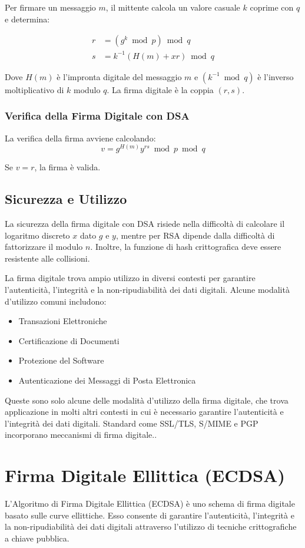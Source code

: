 \documentclass[a4paper,12pt]{report}
\begin{document}
Per firmare un messaggio $m$, il mittente calcola un valore casuale $k$ coprime con $q$ e determina:

\begin{align*}
r &= (g^k \bmod p) \bmod q \\
s &= k^{-1}(H(m) + xr) \bmod q
\end{align*}

Dove $H(m)$ è l'impronta digitale del messaggio $m$ e $(k^{-1} \bmod q)$ è l'inverso moltiplicativo di $k$ modulo $q$. La firma digitale è la coppia $(r, s)$.

\subsection*{Verifica della Firma Digitale con DSA}
La verifica della firma avviene calcolando:
\[v = g^{H(m)}y^{rs} \bmod p \bmod q\]

Se $v = r$, la firma è valida.

\section{Sicurezza e Utilizzo}
La sicurezza della firma digitale con DSA risiede nella difficoltà di calcolare il logaritmo discreto $x$ dato $g$ e $y$, mentre per RSA dipende dalla difficoltà di fattorizzare il modulo $n$. Inoltre, la funzione di hash crittografica deve essere resistente alle collisioni.

La firma digitale trova ampio utilizzo in diversi contesti per garantire l'autenticità, l'integrità e la non-ripudiabilità dei dati digitali. Alcune modalità d'utilizzo comuni includono:

\begin{itemize}
    \item Transazioni Elettroniche
    \item Certificazione di Documenti
    \item Protezione del Software
    \item Autenticazione dei Messaggi di Posta Elettronica
\end{itemize}

Queste sono solo alcune delle modalità d'utilizzo della firma digitale, che trova applicazione in molti altri contesti in cui è necessario garantire l'autenticità e l'integrità dei dati digitali. Standard come SSL/TLS, S/MIME e PGP incorporano meccanismi di firma digitale..
%
%
%
%
%
%
%
%
%
%
%
%

\chapter{Firma Digitale Ellittica (ECDSA)}
L'Algoritmo di Firma Digitale Ellittica (ECDSA) è uno schema di firma digitale basato sulle curve ellittiche. Esso consente di garantire l'autenticità, l'integrità e la non-ripudiabilità dei dati digitali attraverso l'utilizzo di tecniche crittografiche a chiave pubblica.
\end{document}
